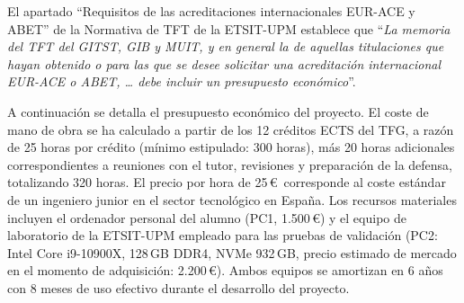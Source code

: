 El apartado ``Requisitos de las acreditaciones internacionales EUR-ACE y ABET'' de la Normativa de TFT de la ETSIT-UPM establece que ``\textit{La memoria del TFT del GITST, GIB y MUIT, y en general la de aquellas titulaciones que hayan obtenido o para las que se desee solicitar una acreditación internacional EUR-ACE o ABET, … debe incluir un presupuesto económico}''.

\vspace{0.3cm}
\noindent A continuación se detalla el presupuesto económico del proyecto. El coste de mano de obra se ha calculado a partir de los 12 créditos ECTS del TFG, a razón de 25 horas por crédito (mínimo estipulado: 300 horas), más 20 horas adicionales correspondientes a reuniones con el tutor, revisiones y preparación de la defensa, totalizando 320 horas. El precio por hora de 25\,\euro\ corresponde al coste estándar de un ingeniero junior en el sector tecnológico en España. Los recursos materiales incluyen el ordenador personal del alumno (PC1, 1.500\,\euro) y el equipo de laboratorio de la ETSIT-UPM empleado para las pruebas de validación (PC2: Intel Core i9-10900X, 128\,GB DDR4, NVMe 932\,GB, precio estimado de mercado en el momento de adquisición: 2.200\,\euro). Ambos equipos se amortizan en 6 años con 8 meses de uso efectivo durante el desarrollo del proyecto.

